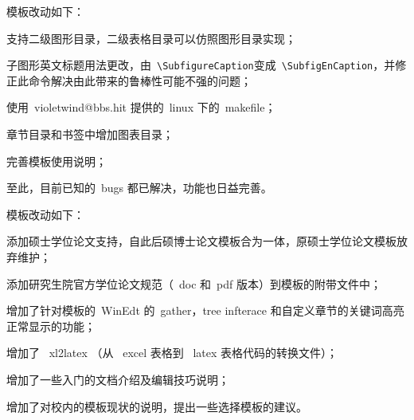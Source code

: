 模板改动如下：
\begin{hitlist}
  \item 支持二级图形目录，二级表格目录可以仿照图形目录实现；
  \item 子图形英文标题用法更改，由~\verb|\SubfigureCaption|变成~\verb|\SubfigEnCaption|，并修正此命令解决由此带来的鲁棒性可能不强的问题；
  \item 使用~violetwind@bbs.hit 提供的~linux 下的~makefile；
  \item 章节目录和书签中增加图表目录；
  \item 完善模板使用说明；
  \item 至此，目前已知的~bugs 都已解决，功能也日益完善。
\end{hitlist}

模板改动如下：
\begin{hitlist}
  \item 添加硕士学位论文支持，自此后硕博士论文模板合为一体，原硕士学位论文模板放弃维护；
  \item 添加研究生院官方学位论文规范（~doc 和~pdf 版本）到模板的附带文件中；
  \item 增加了针对模板的~WinEdt 的~gather，tree infterace 和自定义章节的关键词高亮正常显示的功能；
  \item 增加了~ xl2latex （从~ excel 表格到~ latex 表格代码的转换文件）；
  \item 增加了一些入门的文档介绍及编辑技巧说明；
  \item 增加了对校内的模板现状的说明，提出一些选择模板的建议。
\end{hitlist}


